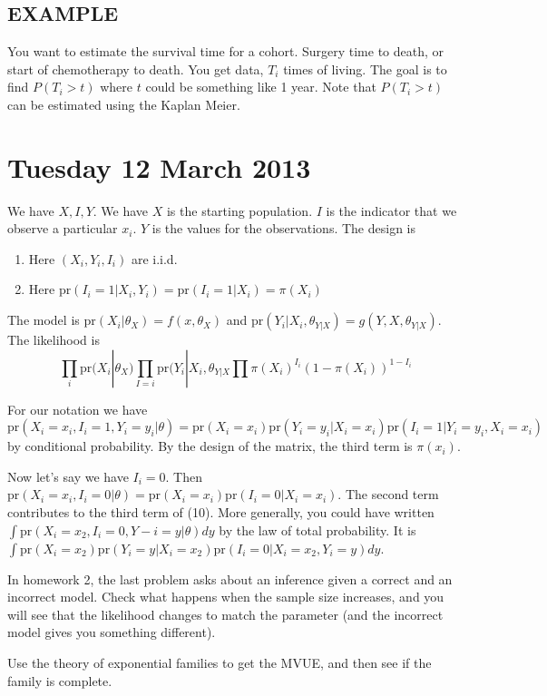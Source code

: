 \documentclass[letterpaper, 12pt]{article}
\theoremstyle{definition}
\theoremstyle{plain}
\newcommand{\pr}{\text{pr}}
\begin{document}
\subsection*{EXAMPLE}
You want to estimate the survival time for a cohort. Surgery time to death, or start of chemotherapy to death. You get data, $T_i$ times of living. The goal is to find $P(T_i > t)$ where $t$ could be something like 1 year. Note that $P( T_i > t)$ can be estimated using the Kaplan Meier. 

\section{Tuesday 12 March 2013}
We have $X, I, Y$. We have $X$ is the starting population. $I$ is the indicator that we observe a particular $x_i$. $Y$ is the values for the observations. The design is
\begin{enumerate}
\item
Here $(X_i,Y_i, I_i)$ are i.i.d.
\item
Here $\pr(I_i = 1 | X_i, Y_i) = \pr (I_{i}=1 | X_i) = \pi (X_i)$
\end{enumerate}
The model is $\pr(X_i | \theta_X) = f(x, \theta_X)$ and $\pr(Y_i | X_i, \theta_{Y|X}) = g(Y, X, \theta_{Y|X})$. The likelihood is 
\begin{equation}
\prod_i \pr(X_i | \theta_X) \prod_{I=i} \pr(Y_i | X_i, \theta_{Y|X} \prod \pi(X_i)^{I_i}(1 - \pi(X_i))^{1 - I_i}
\end{equation}

For our notation we have $\pr(X_i = x_i, I_i = 1, Y_i = y_i | \theta) = \pr(X_i = x_i) \pr(Y_i = y_i | X_i = x_i) \pr(I_i = 1 | Y_i = y_i, X_i=x_i)$ by conditional probability. By the design of the matrix, the third term is $\pi(x_i)$.

Now let's say we have $I_i = 0$. Then $\pr(X_i = x_i, I_i = 0 | \theta) = \pr(X_i = x_i) \pr(I_i = 0 | X_i = x_i)$. The second term contributes to the third term of (10). More generally, you could have written $\int \pr(X_i = x_2, I_i = 0, Y-i = y | \theta) dy$ by the law of total probability. It is $\int \pr(X_i = x_2)\pr(Y_i = y | X_i = x_2) \pr (I_i =0 | X_i = x_2, Y_i=y)dy$.

In homework 2, the last problem asks about an inference given a correct and an incorrect model. Check what happens when the sample size increases, and you will see that the likelihood changes to match the parameter (and the incorrect model gives you something different).

Use the theory of exponential families to get the MVUE, and then see if the family is complete.
\end{document}
